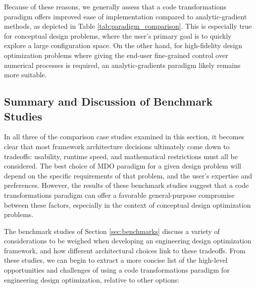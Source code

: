 Because of these reasons, we generally assess that a code transformations paradigm offers improved ease of implementation compared to analytic-gradient methods, as depicted in Table \ref{tab:paradigm_comparison}. This is especially true for conceptual design problems, where the user's primary goal is to quickly explore a large configuration space. On the other hand, for high-fidelity design optimization problems where giving the end-user fine-grained control over numerical processes is required, an analytic-gradients paradigm likely remains more suitable.

\subsection{Summary and Discussion of Benchmark Studies}

In all three of the comparison case studies examined in this section, it becomes clear that most framework architecture decisions ultimately come down to tradeoffs: usability, runtime speed, and mathematical restrictions must all be considered. The best choice of MDO paradigm for a given design problem will depend on the specific requirements of that problem, and the user's expertise and preferences. However, the results of these benchmark studies suggest that a code transformations paradigm can offer a favorable general-purpose compromise between these factors, especially in the context of conceptual design optimization problems.

The benchmark studies of Section \ref{sec:benchmarks} discuss a variety of considerations to be weighed when developing an engineering design optimization framework, and how different architectural choices link to these tradeoffs. From these studies, we can begin to extract a more concise list of the high-level opportunities and challenges of using a code transformations paradigm for engineering design optimization, relative to other options:

